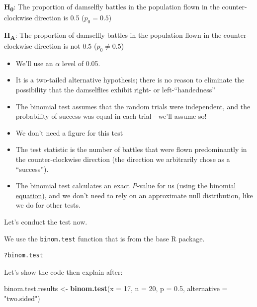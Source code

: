 \documentclass[
]{book}
\newenvironment{Shaded}{\begin{snugshade}}{\end{snugshade}}
\newcommand{\AttributeTok}[1]{\textcolor[rgb]{0.13,0.29,0.53}{#1}}
\newcommand{\DecValTok}[1]{\textcolor[rgb]{0.00,0.00,0.81}{#1}}
\newcommand{\FloatTok}[1]{\textcolor[rgb]{0.00,0.00,0.81}{#1}}
\newcommand{\FunctionTok}[1]{\textcolor[rgb]{0.13,0.29,0.53}{\textbf{#1}}}
\newcommand{\NormalTok}[1]{#1}
\newcommand{\OtherTok}[1]{\textcolor[rgb]{0.56,0.35,0.01}{#1}}
\newcommand{\StringTok}[1]{\textcolor[rgb]{0.31,0.60,0.02}{#1}}
\providecommand{\tightlist}{%
  \setlength{\itemsep}{0pt}\setlength{\parskip}{0pt}}
\begin{document}
\textbf{H\textsubscript{0}}: The proportion of damselfly battles in the population flown in the counter-clockwise direction is 0.5 (\(p_0 = 0.5\))

\textbf{H\textsubscript{A}}: The proportion of damselfly battles in the population flown in the counter-clockwise direction is not 0.5 (\(p_0 \ne 0.5\))

\begin{itemize}
\tightlist
\item
  We'll use an \(\alpha\) level of 0.05.\\
\item
  It is a two-tailed alternative hypothesis; there is no reason to eliminate the possibility that the damselflies exhibit right- or left-``handedness''
\item
  The binomial test assumes that the random trials were independent, and the probability of success was equal in each trial - we'll assume so!
\item
  We don't need a figure for this test
\item
  The test statistic is the number of battles that were flown predominantly in the counter-clockwise direction (the direction we arbitrarily chose as a ``success'').
\item
  The binomial test calculates an exact \emph{P}-value for us (using the \hyperref[binomdist]{binomial equation}), and we don't need to rely on an approximate null distribution, like we do for other tests.
\end{itemize}

Let's conduct the test now.

We use the \texttt{binom.test} function that is from the base R package.

\begin{verbatim}
?binom.test
\end{verbatim}

Let's show the code then explain after:

\begin{Shaded}
\begin{Highlighting}[]
\NormalTok{binom.test.results }\OtherTok{\textless{}{-}} \FunctionTok{binom.test}\NormalTok{(}\AttributeTok{x =} \DecValTok{17}\NormalTok{, }\AttributeTok{n =} \DecValTok{20}\NormalTok{, }\AttributeTok{p =} \FloatTok{0.5}\NormalTok{, }\AttributeTok{alternative =} \StringTok{"two.sided"}\NormalTok{)}
\end{Highlighting}
\end{Shaded}
\end{document}
